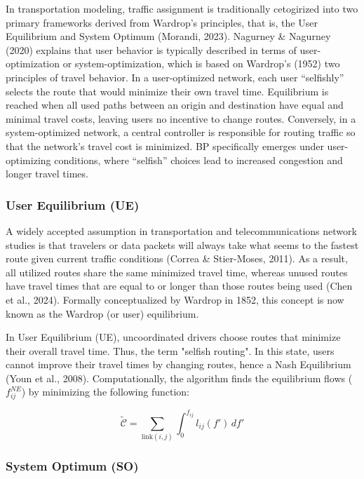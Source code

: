 In transportation modeling, traffic assignment is traditionally cetogirized into two primary frameworks derived from Wardrop's principles, that is, the User Equilibrium and System Optimum (Morandi, 2023). Nagurney \& Nagurney (2020) explains that user behavior is typically described in terms of user-optimization or system-optimization, which is based on Wardrop's (1952) two principles of travel behavior. In a user-optimized network, each user “selfishly” selects the route that would minimize their own travel time. Equilibrium is reached when all used paths between an origin and destination have equal and minimal travel costs, leaving users no incentive to change routes. Conversely, in a system-optimized network, a central controller is responsible for routing traffic so that the network's travel cost is minimized. BP specifically emerges under user-optimizing conditions, where “selfish” choices lead to increased congestion and longer travel times.

\subsubsection{User Equilibrium (UE)}
\label{chap:UE}

A widely accepted assumption in transportation and telecommunications network studies is that travelers or data packets will always take what seems to the fastest route given current traffic conditions (Correa \& Stier-Moses, 2011). As a result, all utilized routes share the same minimized travel time, whereas unused routes have travel times that are equal to or longer than those routes being used (Chen et al., 2024). Formally conceptualized by Wardrop in 1852, this concept is now known as the Wardrop (or user) equilibrium.

In User Equilibrium (UE), uncoordinated drivers choose routes that minimize their overall travel time. Thus, the term "selfish routing". In this state, users cannot improve their travel times by changing routes, hence a Nash Equilibrium (Youn et al., 2008). Computationally, the algorithm finds the equilibrium flows ($f_{ij}^{NE}$) by minimizing the following function:

\begin{equation}
    \tilde{\mathcal{C}} = \sum_{\text{link}(i,j)} \int_{0}^{f_{ij}} l_{ij}(f') \, df'
    \label{eq:beckmann_objective}
\end{equation}

\subsubsection{System Optimum (SO)}
\label{chap:SO}

